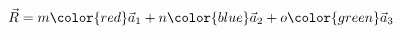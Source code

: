 \documentclass[preview]{standalone}
\begin{document}
\begin{align*}
\vec{R} = m {\color{red}\vec{a}_1} + n {\color{blue}\vec{a}_2} + o {\color{green}\vec{a}_3}
\end{align*}
\end{document}
